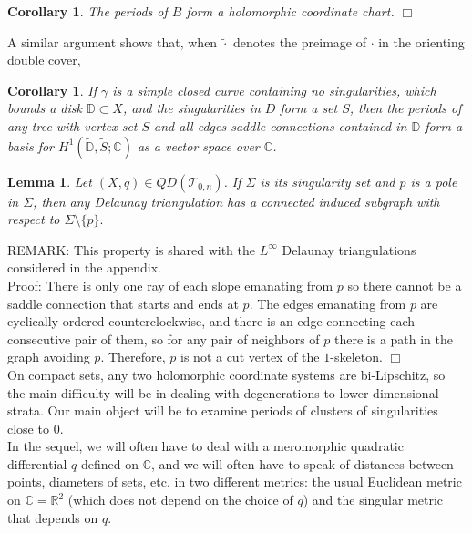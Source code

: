 \documentclass[12pt]{article}
\newtheorem{lemma}[theorem]{Lemma}
\newtheorem{corollary}[theorem]{Corollary}
\newcommand{\rr}{\mathbb{R}}
\newcommand{\cc}{\mathbb{C}}
\begin{document}
\begin{corollary}The periods of $B$ form a holomorphic coordinate chart. $\Box$\end{corollary}

\noindent A similar argument shows that, when $\tilde{\cdot}$ denotes the preimage of $\cdot$ in the orienting double cover,

\begin{corollary}\label{CoroAnybasis} If $\gamma$ is a simple closed curve containing no singularities, which bounds a disk $\mathbb{D} \subset  X$, and the singularities in $D$ form a set $S$, then the periods of any tree with vertex set $S$ and all edges saddle connections contained in $\mathbb{D}$ form a basis for $H^1(\tilde{\mathbb{D}},\tilde{S}; \cc)$ as a vector space over $\cc$.\end{corollary}

\begin{lemma}Let $(X,q) \in QD(\mathcal{T}_{0,n})$. If $\Sigma$ is its singularity set and $p$ is a pole in $\Sigma$, then any Delaunay triangulation has a connected induced subgraph with respect to $\Sigma \setminus \{p\}.$\end{lemma}

\noindent REMARK: This property is shared with the $L^\infty$ Delaunay triangulations considered in the appendix.\\

\noindent Proof: There is only one ray of each slope emanating from $p$ so there cannot be a saddle connection that starts and ends at $p$. The edges emanating from $p$ are cyclically ordered counterclockwise, and there is an edge connecting each consecutive pair of them, so for any pair of neighbors of $p$ there is a path in the graph avoiding $p$. Therefore, $p$ is not a cut vertex of the $1$-skeleton. $\Box$\\

\noindent On compact sets, any two holomorphic coordinate systems are bi-Lipschitz, so the main difficulty will be in dealing with degenerations to lower-dimensional strata. Our main object will be to examine periods of clusters of singularities close to $0$.\\

\noindent In the sequel, we will often have to deal with a meromorphic quadratic differential $q$ defined on $\cc$, and we will often have to speak of distances between points, diameters of sets, etc. in two different metrics: the usual Euclidean metric on $\cc = \rr^2$ (which does not depend on the choice of $q$) and the singular metric that depends on $q$.
\end{document}
